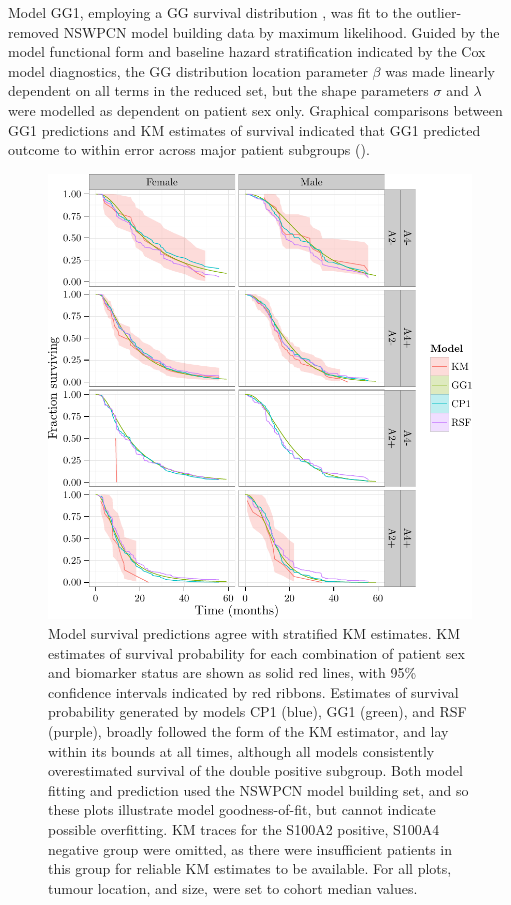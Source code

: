 \documentclass[dissertation.tex]{subfiles}
\begin{document}
Model GG1, employing a \gls{GG} survival distribution \cite{Cox2007}, was fit to the outlier-removed \gls{NSWPCN} model building data by maximum likelihood.  Guided by the model functional form and baseline hazard stratification indicated by the Cox model diagnostics, the \gls{GG} distribution location parameter $\beta$ was made linearly dependent on all terms in the reduced set, but the shape parameters $\sigma$ and $\lambda$ were modelled as dependent on patient sex only.  Graphical comparisons between GG1 predictions and \gls{KM} estimates of survival indicated that GG1 predicted outcome to within error across major patient subgroups ().

\begin{figure}
\centering
  \includegraphics[width=.85\linewidth]{analysis/nomogram/figure/05-final-fit-assessment-2}
  \caption[Model survival predictions agree with stratified \acrshort{KM} estimates]{Model survival predictions agree with stratified \gls{KM} estimates.  \gls{KM} estimates of survival probability for each combination of patient sex and biomarker status are shown as solid red lines, with 95\% confidence intervals indicated by red ribbons.  Estimates of survival probability generated by models CP1 (blue), GG1 (green), and RSF (purple), broadly followed the form of the \gls{KM} estimator, and lay within its bounds at all times, although all models consistently overestimated survival of the double positive subgroup.  Both model fitting and prediction used the \gls{NSWPCN} model building set, and so these plots illustrate model goodness-of-fit, but cannot indicate possible overfitting.  \gls{KM} traces for the S100A2 positive, S100A4 negative group were omitted, as there were insufficient patients in this group for reliable \gls{KM} estimates to be available.  For all plots, tumour location, and size, were set to cohort median values.}
\label{fig:nomo-cp1-gg1-fitplot}
\end{figure}
\end{document}
